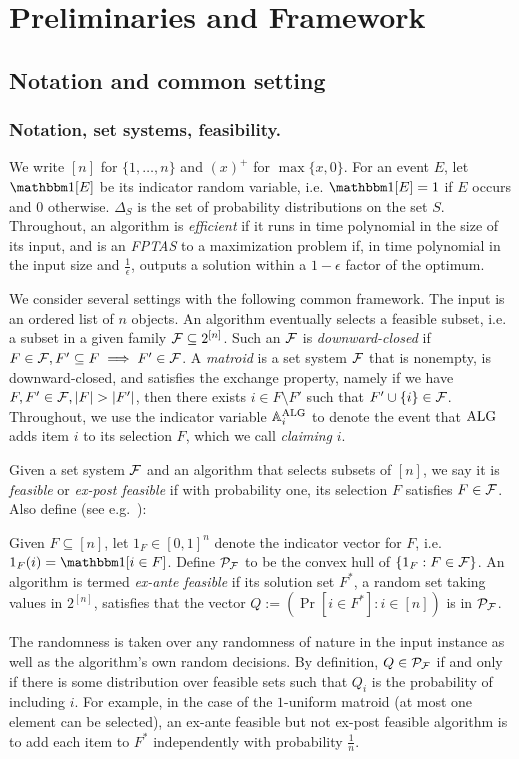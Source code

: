 \section{Preliminaries and Framework} \label{sec:model}

\subsection{Notation and common setting}

\subsubsection{Notation, set systems, feasibility.}
We write $[n]$ for $\{1,\dots,n\}$ and $(x)^+$ for $\max\{x,0\}$.
For an event $E$, let $\Indic{E}$ be its indicator random variable, i.e. $\Indic{E} = 1$ if $E$ occurs and $0$ otherwise.
$\Delta_{S}$ is the set of probability distributions on the set $S$.
Throughout, an algorithm is \emph{efficient} if it runs in time polynomial in the size of its input, and is an \emph{FPTAS} to a maximization problem if, in time polynomial in the input size and $\tfrac{1}{\epsilon}$, outputs a solution within a $1-\epsilon$ factor of the optimum.

We consider several settings with the following common framework.
The input is an ordered list of $n$ objects.
An algorithm eventually selects a feasible subset, i.e. a subset in a given family $\mathcal{F} \subseteq 2^{[n]}$.
Such an $\mathcal{F}$ is \emph{downward-closed} if $F \in \mathcal{F}, F' \subseteq F \implies F' \in \mathcal{F}$.
A \emph{matroid} is a set system $\mathcal{F}$ that is nonempty, is downward-closed, and satisfies the exchange property, namely if we have $F,F' \in \mathcal{F}, |F| > |F'|$, then there exists $i \in F \setminus F'$ such that $F' \cup \{i\} \in \mathcal{F}$.
Throughout, we use the indicator variable $\mathbb{A}^{\mathrm{ALG}}_i$ to denote the event that $\mathrm{ALG}$ adds item $i$ to its selection $F$, which we call \emph{claiming} $i$.

Given a set system $\mathcal{F}$ and an algorithm that selects subsets of $[n]$, we say it is \emph{feasible} or \emph{ex-post feasible} if with probability one, its selection $F$ satisfies $F \in \mathcal{F}$.
Also define (see e.g.~\citep{lee2018optimal}):
\begin{definition} \label{def:ex-ante}
	Given $F \subseteq [n]$, let $1_F \in [0,1]^n$ denote the indicator vector for $F$, i.e. $1_F(i) = \Indic{i \in F}$.
	Define $\mathcal{P}_{\mathcal{F}}$ to be the convex hull of $\{1_F : F \in \mathcal{F}\}$.
	An algorithm is termed \emph{ex-ante feasible} if its solution set $F^*$, a random set taking values in $2^{[n]}$, satisfies that the vector $Q := (\Pr[i \in F^*] : i \in [n])$ is in $\mathcal{P}_{\mathcal{F}}$.
\end{definition}
The randomness is taken over any randomness of nature in the input instance as well as the algorithm's own random decisions.
By definition, $Q \in \mathcal{P}_{\mathcal{F}}$ if and only if there is some distribution over feasible sets such that $Q_i$ is the probability of including $i$.
For example, in the case of the $1$-uniform matroid (at most one element can be selected), an ex-ante feasible but not ex-post feasible algorithm is to add each item to $F^*$ independently with probability $\frac{1}{n}$.

